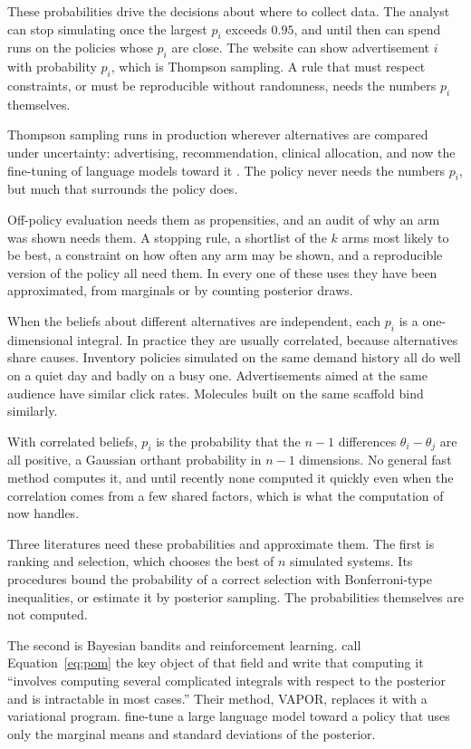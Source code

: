 \documentclass[11pt]{article}
\begin{document}
These probabilities drive the decisions about where to collect data. The analyst can
stop simulating once the largest $p_i$ exceeds $0.95$, and until then
can spend runs on the policies whose $p_i$ are close. The website can
show advertisement $i$ with probability $p_i$, which is Thompson
sampling. A rule that must respect constraints, or must be
reproducible without randomness, needs the numbers $p_i$ themselves.

Thompson sampling runs in production wherever alternatives are
compared under uncertainty: advertising, recommendation, clinical
allocation, and now the fine-tuning of language models toward it \citep{menet2026}. The policy never needs the numbers
$p_i$, but much that surrounds the
policy does.

Off-policy evaluation needs them as propensities, and an audit of why
an arm was shown needs them. A stopping rule, a shortlist of the $k$
arms most likely to be best, a constraint on how often any arm may be
shown, and a reproducible version of the policy all need them. In
every one of these uses they have been approximated, from marginals
or by counting posterior draws.

When the beliefs about different alternatives are independent, each
$p_i$ is a one-dimensional integral. In practice they are usually
correlated, because alternatives share causes. Inventory policies
simulated on the same demand history all do well on a quiet day and
badly on a busy one. Advertisements aimed at the same audience have
similar click rates. Molecules built on the same scaffold bind similarly.

With correlated beliefs, $p_i$ is the probability that
the $n - 1$ differences $\theta_i - \theta_j$ are all positive, a Gaussian orthant probability in $n - 1$ dimensions. No general
fast method computes it, and until recently none computed it quickly
even when the correlation comes from a few shared factors, which is what the computation of \citet{cotton2026} now handles.

Three literatures need these probabilities and approximate them. The first is
ranking and selection, which chooses the best of $n$ simulated
systems. Its procedures bound the probability of a correct selection
with Bonferroni-type inequalities, or estimate it by posterior
sampling. The probabilities themselves are not computed.

The second is Bayesian bandits and reinforcement learning.
\citet{tarbouriech2023} call Equation~\eqref{eq:pom} the key object of
that field and write that computing it ``involves computing several
complicated integrals with respect to the posterior and is intractable
in most cases.'' Their method, VAPOR, replaces it with a variational
program. \citet{menet2026} fine-tune a large language model toward a policy
that uses only the marginal means and standard deviations of the
posterior.
\end{document}
